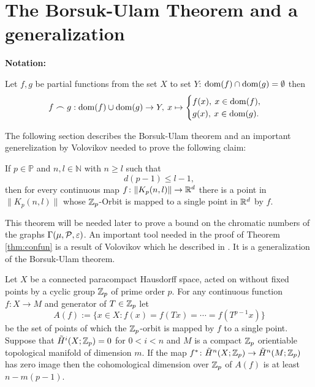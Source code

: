 \section{The Borsuk-Ulam Theorem and a generalization}

\textbf{Notation:}

Let $f, g$ be partial functions from the set $X$ to set $Y$: $\dom(f) \cap \dom(g) = \emptyset$ then
\begin{equation*}
  f \frown g: \dom(f) \cup \dom(g) \to Y, \: x \mapsto \begin{cases}
    f(x), \: x \in \dom(f), \\
    g(x), \: x \in \dom(g).
  \end{cases}
\end{equation*}

The following section describes the Borsuk-Ulam theorem and an important generelization by Volovikov needed to prove the following claim:
\begin{thm}\label{thm:confun}
  If $p \in \mathbb{P}$ and $n, l \in \mathbb{N}$ with $n \geq l$ such that
  \begin{equation*}
    d(p-1) \leq l-1,
  \end{equation*}
  then for every continuous map $f\colon\lVert K_p(n,l)\rVert \to \R^d$ there is a point in $\lVert K_p(n,l)\rVert$ whose $\Z_p$-Orbit is mapped to a single point in $\R^d$ by $f$.
\end{thm}
This theorem will be needed later to prove a bound on the chromatic numbers of the graphs $\Gamma(\mu, \P, \varepsilon)$.
An important tool needed in the proof of Theorem \ref{thm:confun} is a result of Volovikov which he described in \cite{vol1980}. It is a generalization of the Borsuk-Ulam theorem.
\begin{lemma}\label{lem:vol}
  Let $X$ be a connected paracompact Hausdorff space, acted on without fixed points by a cyclic group $\Z_p$ of prime order $p$. For any continuous function $f\colon X \to M$ and generator of $T \in \Z_p$ let
  \begin{equation*}
    A(f) := \{x\in X\colon f(x) = f(Tx) = \cdots = f(T^{p-1}x)\}
  \end{equation*}
  be the set of points of which the $\Z_p$-orbit is mapped by $f$ to a single point. Suppose that $\tilde{H}^i(X; \Z_p) = 0$ for $0 < i < n$ and $M$ is a compact $\Z_p$ orientiable topological manifold of dimension $m$. If the map $f^*\colon \tilde{H}^n(X; \Z_p) \to \tilde{H}^n(M; \Z_p)$ has zero image then the cohomological dimension over $\Z_p$ of $A(f)$ is at least $n-m(p-1)$. 
\end{lemma}

